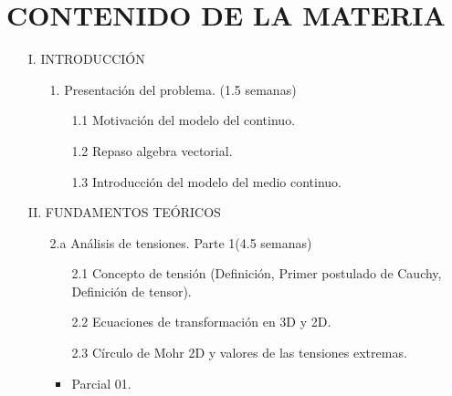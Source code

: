 \section*{CONTENIDO DE LA MATERIA}
%
\begin{itemize}
%
	\item[I.] INTRODUCCIÓN 
	\begin{itemize}
		\item[1.] Presentación del problema. (1.5 semanas)
		\begin{itemize}
			\item[1.1] Motivación del modelo del continuo.
			\item[1.2] Repaso algebra vectorial.	
			\item[1.3] Introducción del modelo del medio continuo.	
		\end{itemize}
	\end{itemize}
	\item[II.] FUNDAMENTOS TEÓRICOS
	\begin{itemize}
		\item[2.a] Análisis de tensiones. Parte 1(4.5 semanas)
		\begin{itemize}
			\item[2.1] Concepto de tensión (Definición, Primer postulado de Cauchy, Definición de tensor).			
			\item[2.2] Ecuaciones de transformación en 3D y 2D.
			\item[2.3] Círculo de Mohr 2D y valores de las tensiones extremas.
			\item Parcial 01.
		\end{itemize}			


\end{itemize}
\end{itemize}
